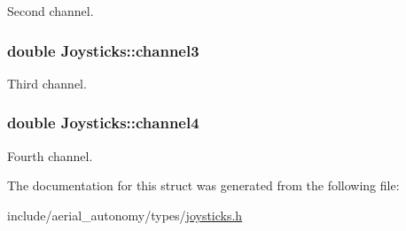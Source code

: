 Second channel. 

\hypertarget{structJoysticks_a2640f7dbb2364b8d92c464077c38ec56}{
\subsubsection[{channel3}]{\setlength{\rightskip}{0pt plus 5cm}double Joysticks\-::channel3}}\label{structJoysticks_a2640f7dbb2364b8d92c464077c38ec56}


Third channel. 

\hypertarget{structJoysticks_a154d66609cbfcb527d4dcf7473bf7af5}{
\subsubsection[{channel4}]{\setlength{\rightskip}{0pt plus 5cm}double Joysticks\-::channel4}}\label{structJoysticks_a154d66609cbfcb527d4dcf7473bf7af5}


Fourth channel. 



The documentation for this struct was generated from the following file\-:\begin{DoxyCompactItemize}
\item 
include/aerial\-\_\-autonomy/types/\hyperlink{joysticks_8h}{joysticks.\-h}\end{DoxyCompactItemize}
